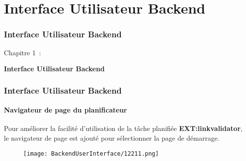 %

\section{Interface Utilisateur Backend}
\begin{frame}[fragile]
	\frametitle{Interface Utilisateur Backend}

	\begin{center}\huge{Chapitre 1~:}\end{center}
	\begin{center}\huge{\color{typo3darkgrey}\textbf{Interface Utilisateur Backend}}\end{center}

\end{frame}

\begin{frame}[fragile]
	\frametitle{Interface Utilisateur Backend}
	\framesubtitle{Navigateur de page du planificateur}

	Pour améliorer la facilité d'utilisation de la tâche planifiée
	\textbf{EXT:linkvalidator}, le navigateur de page est ajouté pour
	sélectionner la page de démarrage.

	\begin{figure}\vspace{-0.2cm}
		\texttt{[image: BackendUserInterface/12211.png]}
	\end{figure}

\end{frame}

